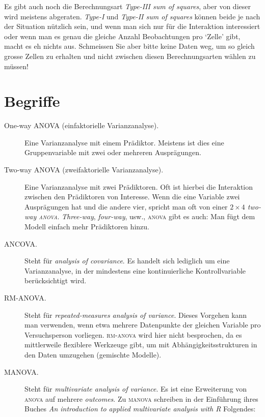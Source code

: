 \documentclass[oneside, 10pt]{book}\usepackage[]{graphicx}\usepackage[]{xcolor}
\begin{document}
 Es gibt auch noch die Berechnungsart \textit{Type-III sum of squares},
 aber von dieser wird meistens abgeraten. \textit{Type-I} und \textit{Type-II sum of squares}
 können beide je nach der Situation nützlich sein, und wenn man sich nur für die Interaktion
 interessiert oder wenn man es genau die gleiche Anzahl Beobachtungen pro `Zelle' gibt,
 macht es eh nichts aus.
 Schmeissen Sie aber bitte keine Daten weg,
um so gleich grosse Zellen zu erhalten und nicht zwischen diesen
Berechnungsarten wählen zu müssen!

\section{Begriffe}

\begin{description}
 \item[One-way ANOVA (einfaktorielle Varianzanalyse).]
 Eine Varianzanalyse mit einem
 Prädiktor. Meistens ist dies eine Gruppenvariable
 mit zwei oder mehreren Ausprägungen.

 \item[Two-way ANOVA (zweifaktorielle Varianzanalyse).]
 Eine Varianzanalyse mit zwei
 Prädiktoren. Oft ist hierbei die Interaktion zwischen den
 Prädiktoren von Interesse. Wenn die eine Variable zwei Ausprägungen
 hat und die andere vier, spricht man oft von einer
 \textit{$2 \times 4$ two-way \textsc{anova}}. \textit{Three-way},
 \textit{four-way}, usw., \textsc{anova} gibt es auch: Man fügt
 dem Modell einfach mehr Prädiktoren hinzu.

 \item[\textsc{ANCOVA}.] Steht für \textit{analysis of covariance}.
 Es handelt sich lediglich um eine Varianzanalyse, in der mindestens eine
 kontinuierliche Kontrollvariable berücksichtigt wird.

 \item[\textsc{RM-ANOVA}.] Steht für \textit{repeated-measures analysis of variance}.
 Dieses Vorgehen kann man verwenden, wenn etwa mehrere Datenpunkte der gleichen
 Variable pro Versuchsperson vorliegen. \textsc{rm-anova} wird hier
 nicht besprochen, da es mittlerweile flexiblere Werkzeuge gibt,
 um mit Abhängigkeitsstrukturen in den Daten umzugehen (gemischte Modelle).

 \item[\textsc{MANOVA}.] Steht für \textit{multivariate analysis of variance}.
 Es ist eine Erweiterung von \textsc{anova} auf mehrere \textit{outcomes}.
 Zu \textsc{manova} schreiben \citet{Everitt2011} in der Einführung
 ihres Buches \textit{An introduction to applied multivariate analysis with R}
 Folgendes:

\end{description}
\end{document}
